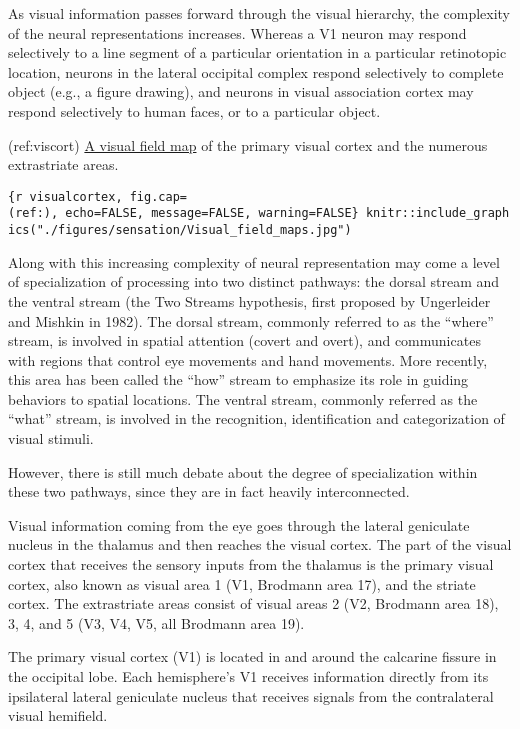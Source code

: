As visual information passes forward through the visual hierarchy, the
complexity of the neural representations increases. Whereas a V1 neuron
may respond selectively to a line segment of a particular orientation in
a particular retinotopic location, neurons in the lateral occipital
complex respond selectively to complete object (e.g., a figure drawing),
and neurons in visual association cortex may respond selectively to
human faces, or to a particular object.

(ref:viscort)
\href{https://commons.wikimedia.org/wiki/File:Visual_field_maps.jpg}{A
visual field map} of the primary visual cortex and the numerous
extrastriate areas.

\texttt{\{r\ visualcortex,\ fig.cap=\textquotesingle{}(ref:)\textquotesingle{},\ echo=FALSE,\ message=FALSE,\ warning=FALSE\}\ knitr::include\_graphics("./figures/sensation/Visual\_field\_maps.jpg")}

Along with this increasing complexity of neural representation may come
a level of specialization of processing into two distinct pathways: the
dorsal stream and the ventral stream (the Two Streams hypothesis, first
proposed by Ungerleider and Mishkin in 1982). The dorsal stream,
commonly referred to as the ``where'' stream, is involved in spatial
attention (covert and overt), and communicates with regions that control
eye movements and hand movements. More recently, this area has been
called the ``how'' stream to emphasize its role in guiding behaviors to
spatial locations. The ventral stream, commonly referred as the ``what''
stream, is involved in the recognition, identification and
categorization of visual stimuli.

However, there is still much debate about the degree of specialization
within these two pathways, since they are in fact heavily
interconnected.

Visual information coming from the eye goes through the lateral
geniculate nucleus in the thalamus and then reaches the visual cortex.
The part of the visual cortex that receives the sensory inputs from the
thalamus is the primary visual cortex, also known as visual area 1 (V1,
Brodmann area 17), and the striate cortex. The extrastriate areas
consist of visual areas 2 (V2, Brodmann area 18), 3, 4, and 5 (V3, V4,
V5, all Brodmann area 19).

The primary visual cortex (V1) is located in and around the calcarine
fissure in the occipital lobe. Each hemisphere's V1 receives information
directly from its ipsilateral lateral geniculate nucleus that receives
signals from the contralateral visual hemifield.

